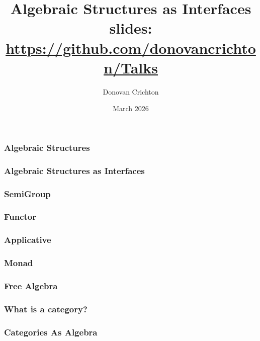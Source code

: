 \documentclass
  [hyperref={colorlinks = true,linkcolor = blue, 
             citecolor = blue, urlcolor = blue}
  ]{beamer}
\title{Algebraic Structures as Interfaces
       \small slides: 
       \href{https://github.com/donovancrichton/Talks}
            {https://github.com/donovancrichton/Talks}}
\author{Donovan Crichton}
\date{March 2026}
\newcommand{\SlidePath}[1]{./Slides/#1}
\begin{document}
 
\frame{\titlepage}

\begin{frame}[fragile]
  \frametitle{Maths Prerequisites}
    }
\end{frame}

\begin{frame}[fragile]
  \frametitle{Algebraic Structures}
\end{frame}

\begin{frame}[fragile]
  \frametitle{Algebraic Structures as Interfaces}
\end{frame}

\begin{frame}[fragile]
  \frametitle{SemiGroup}
\end{frame}

\begin{frame}[fragile]
  \frametitle{Functor}
\end{frame}

\begin{frame}[fragile]
  \frametitle{Applicative}
\end{frame}

\begin{frame}[fragile]
  \frametitle{Monad}
\end{frame}

\begin{frame}[fragile]
  \frametitle{Free Algebra}
\end{frame}

\begin{frame}[fragile]
  \frametitle{What is a category?}
\end{frame}

\begin{frame}[fragile]
  \frametitle{Categories As Algebra}
\end{frame}

\begin{frame}[fragile]
\end{frame}
\end{document}
